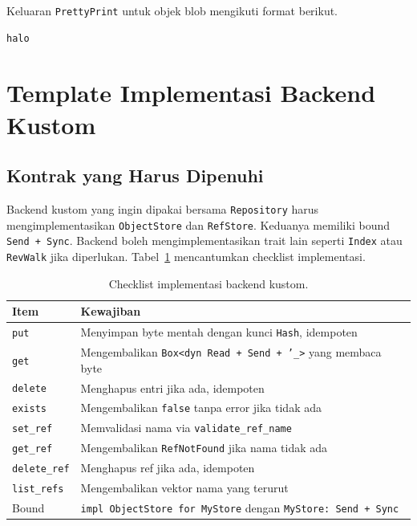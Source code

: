 \documentclass[11pt,a4paper]{article}
\begin{document}
Keluaran \texttt{PrettyPrint} untuk objek blob mengikuti format berikut.

\begin{lstlisting}[style=out]
halo
\end{lstlisting}

\section{Template Implementasi Backend Kustom}

\subsection{Kontrak yang Harus Dipenuhi}

Backend kustom yang ingin dipakai bersama \texttt{Repository} harus mengimplementasikan \texttt{ObjectStore} dan \texttt{RefStore}. Keduanya memiliki bound \texttt{Send + Sync}. Backend boleh mengimplementasikan trait lain seperti \texttt{Index} atau \texttt{RevWalk} jika diperlukan. Tabel~\ref{tab:backend} mencantumkan checklist implementasi.

\begin{table}[H]
	\centering
	\caption{Checklist implementasi backend kustom.}
	\label{tab:backend}
	\footnotesize
	\begin{tabularx}{\textwidth}{l X}
		\toprule
		Item & Kewajiban \\
		\midrule
		\texttt{put} & Menyimpan byte mentah dengan kunci \texttt{Hash}, idempoten \\
		\texttt{get} & Mengembalikan \texttt{Box<dyn Read + Send + '\_>} yang membaca byte \\
		\texttt{delete} & Menghapus entri jika ada, idempoten \\
		\texttt{exists} & Mengembalikan \texttt{false} tanpa error jika tidak ada \\
		\texttt{set\_ref} & Memvalidasi nama via \texttt{validate\_ref\_name} \\
		\texttt{get\_ref} & Mengembalikan \texttt{RefNotFound} jika nama tidak ada \\
		\texttt{delete\_ref} & Menghapus ref jika ada, idempoten \\
		\texttt{list\_refs} & Mengembalikan vektor nama yang terurut \\
		Bound & \texttt{impl ObjectStore for MyStore} dengan \texttt{MyStore: Send + Sync} \\
		\bottomrule
	\end{tabularx}
\end{table}
\end{document}
